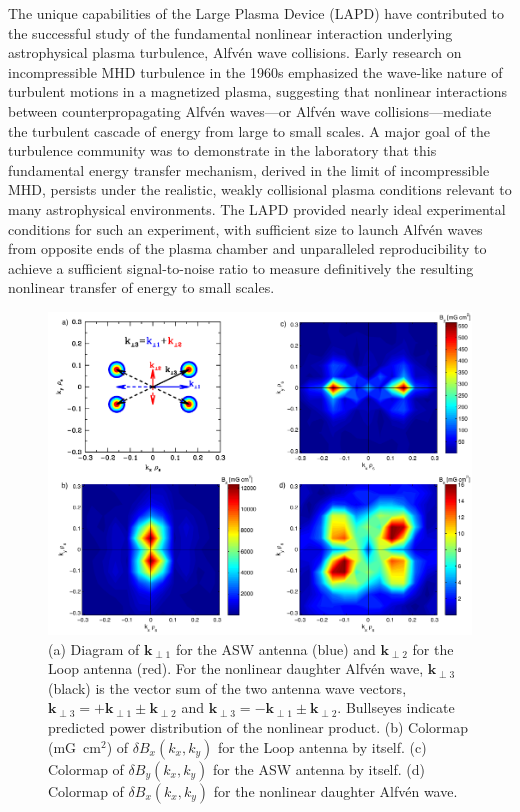 \documentclass[11pt]{article}
\newcommand\Alfven{Alfv\'en }
\newcommand{\V}[1]{\mathbf{#1}}
\renewcommand{\cite}{\citep}
\begin{document}
The unique capabilities of the Large Plasma Device (LAPD) have
contributed to the successful study of the fundamental nonlinear
interaction underlying astrophysical plasma turbulence, \Alfven wave
collisions.  Early research on incompressible MHD turbulence in the
1960s \cite{Iroshnikov:1963,Kraichnan:1965} emphasized the wave-like
nature of turbulent motions in a magnetized plasma, suggesting that
nonlinear interactions between counterpropagating \Alfven waves---or
\Alfven wave collisions---mediate the turbulent cascade of energy from
large to small scales. A major goal of the turbulence community was to
demonstrate in the laboratory that this fundamental energy transfer
mechanism, derived in the limit of incompressible MHD, persists under
the realistic, weakly collisional plasma conditions relevant to many
astrophysical environments. The LAPD provided nearly ideal
experimental conditions for such an experiment, with sufficient size
to launch \Alfven waves from opposite ends of the plasma chamber and
unparalleled reproducibility to achieve a sufficient signal-to-noise
ratio to measure definitively the resulting nonlinear transfer of
energy to small scales.

\begin{figure}[!htbp]
\centerline{
\includegraphics[width=3.5truein]{iowa}}
\caption{ (a) Diagram of $\V{k}_{\perp 1}$ for the ASW
antenna (blue) and  $\V{k}_{\perp 2}$ for the Loop antenna (red).
For the nonlinear daughter \Alfven wave, $\V{k}_{\perp 3}$ (black) is
the vector sum of the two antenna wave vectors, $\V{k}_{\perp 3} = +
\V{k}_{\perp 1} \pm \V{k}_{\perp 2} $ and $\V{k}_{\perp 3} = -
\V{k}_{\perp 1} \pm \V{k}_{\perp 2} $. Bullseyes indicate predicted
power distribution of the nonlinear product.  (b) Colormap (mG~cm$^2$)
of $\delta B_x(k_x,k_y)$ for the Loop antenna by itself.  (c) Colormap
of $\delta B_y(k_x,k_y)$ for the ASW antenna by itself. (d) Colormap
of $\delta B_x(k_x,k_y)$ for the nonlinear daughter \Alfven wave.}\label{iowa}
\end{figure}
\end{document}

